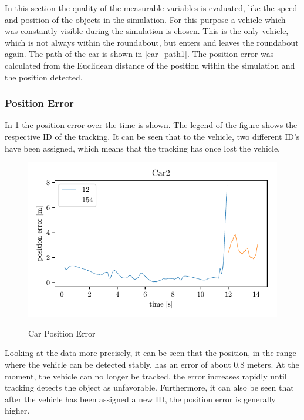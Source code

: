 \documentclass[11pt,oneside,openright]{mpreport}
\begin{document}
In this section the quality of the measurable variables is evaluated, like the speed and position of the objects in the simulation.
For this purpose a vehicle which was constantly visible during the simulation is chosen.
This is the only vehicle, which is not always within the roundabout, but enters and leaves the roundabout again. 
The path of the car is shown in \cref{car_path1}. The position error was calculated from the Euclidean distance of the position within the simulation and the position detected.

\subsubsection{Position Error}


In \cref{car_pos_err} the position error over the time is shown. The legend of the figure shows the respective ID of the tracking. 
It can be seen that to the vehicle, two different ID's have been assigned, which means that the tracking has once lost the vehicle.

\begin{figure}[!htb]
  \caption{Car Position Error} 
  \centering
  \includegraphics[width=\textwidth]{bilder/Car2_pos_err.pdf}
 \label{car_pos_err}
\end{figure}
Looking at the data more precisely, it can be seen that the position, in the range where the vehicle can be detected stably, has an error of about 0.8 meters.
At the moment, the vehicle can no longer be tracked, the error increases rapidly until tracking detects the object as unfavorable.
Furthermore, it can also be seen that after the vehicle has been assigned a new ID, the position error is generally higher.
\end{document}
